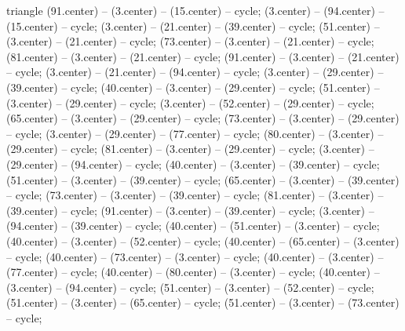 \begin{pgfonlayer}{triangle}
 (91.center) -- (3.center) -- (15.center) -- cycle; 
 (3.center) -- (94.center) -- (15.center) -- cycle; 
 (3.center) -- (21.center) -- (39.center) -- cycle; 
 (51.center) -- (3.center) -- (21.center) -- cycle; 
 (73.center) -- (3.center) -- (21.center) -- cycle; 
 (81.center) -- (3.center) -- (21.center) -- cycle; 
 (91.center) -- (3.center) -- (21.center) -- cycle; 
 (3.center) -- (21.center) -- (94.center) -- cycle; 
 (3.center) -- (29.center) -- (39.center) -- cycle; 
 (40.center) -- (3.center) -- (29.center) -- cycle; 
 (51.center) -- (3.center) -- (29.center) -- cycle; 
 (3.center) -- (52.center) -- (29.center) -- cycle; 
 (65.center) -- (3.center) -- (29.center) -- cycle; 
 (73.center) -- (3.center) -- (29.center) -- cycle; 
 (3.center) -- (29.center) -- (77.center) -- cycle; 
 (80.center) -- (3.center) -- (29.center) -- cycle; 
 (81.center) -- (3.center) -- (29.center) -- cycle; 
 (3.center) -- (29.center) -- (94.center) -- cycle; 
 (40.center) -- (3.center) -- (39.center) -- cycle; 
 (51.center) -- (3.center) -- (39.center) -- cycle; 
 (65.center) -- (3.center) -- (39.center) -- cycle; 
 (73.center) -- (3.center) -- (39.center) -- cycle; 
 (81.center) -- (3.center) -- (39.center) -- cycle; 
 (91.center) -- (3.center) -- (39.center) -- cycle; 
 (3.center) -- (94.center) -- (39.center) -- cycle; 
 (40.center) -- (51.center) -- (3.center) -- cycle; 
 (40.center) -- (3.center) -- (52.center) -- cycle; 
 (40.center) -- (65.center) -- (3.center) -- cycle; 
 (40.center) -- (73.center) -- (3.center) -- cycle; 
 (40.center) -- (3.center) -- (77.center) -- cycle; 
 (40.center) -- (80.center) -- (3.center) -- cycle; 
 (40.center) -- (3.center) -- (94.center) -- cycle; 
 (51.center) -- (3.center) -- (52.center) -- cycle; 
 (51.center) -- (3.center) -- (65.center) -- cycle; 
 (51.center) -- (3.center) -- (73.center) -- cycle; 

\end{pgfonlayer}

